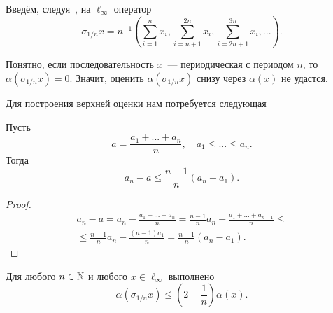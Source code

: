 Введём, следуя~\cite[p. 131, prop. 2.b.2]{lindenstrauss1979classical},
на $\ell_\infty$ оператор
\begin{equation}
	\sigma_{1/n} x = n^{-1}
	\left(
		\sum_{i=1}^{n} x_i,
		\sum_{i=n+1}^{2n} x_i,
		\sum_{i=2n+1}^{3n} x_i,
		...
	\right).
\end{equation}

Понятно, если последовательность $x$~--- периодическая с периодом $n$,
то $\alpha(\sigma_{1/n}x)=0$.
Значит, оценить $\alpha(\sigma_{1/n}x)$ снизу через $\alpha(x)$ не удастся.

Для построения верхней оценки нам потребуется следующая

\begin{lemma}
	\label{thm:distance_from_average}
	Пусть
	\begin{equation}
		a=\frac{a_1+...+a_n}{n}, \quad a_1 \leq ... \leq a_n
		.
	\end{equation}
	Тогда
	\begin{equation}
		a_n - a \leq \frac{n-1}{n} (a_n - a_1)
		.
	\end{equation}
\end{lemma}

\begin{proof}
	\begin{multline}
		a_n - a = a_n - \frac{a_1+...+a_n}{n}
		=
		\frac{n-1}{n}a_n - \frac{a_1+...+a_{n-1}}{n}
		\leq
		\\\leq
		\frac{n-1}{n}a_n - \frac{(n-1)a_1}{n}
		=
		\frac{n-1}{n}(a_n - a_1)
		.
	\end{multline}
\end{proof}

\begin{theorem}
	\label{thm:alpha_sigma_1_n}
	Для любого $n\in\mathbb{N}$ и любого $x\in\ell_\infty$ выполнено
	\begin{equation}
		\alpha(\sigma_{1/n} x) \leq \left( 2- \frac{1}{n} \right) \alpha(x)
		.
	\end{equation}
\end{theorem}

